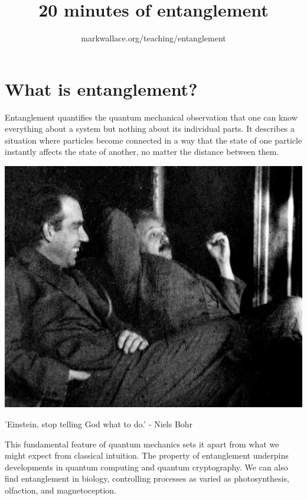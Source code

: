 \documentclass[]{tufte-handout}
\title{20 minutes of entanglement}
\author{markwallace.org/teaching/entanglement}
\date{}
\begin{document}
\maketitle


\setlength{\parindent}{0pt}



\hypertarget{what-is-entanglement}{%
\section{What is entanglement?}\label{what-is-entanglement}}

Entanglement quantifies the quantum mechanical observation that one can know everything about a system but nothing about its individual parts. It describes a situation where particles become connected in a way that the state of one particle instantly affects the state of another, no matter the distance between them.

\begin{marginfigure}

{\centering \includegraphics{img/Niels_Bohr_Albert_Einstein4} 

}

\caption['Einstein, stop telling God what to do.' - Niels Bohr]{'Einstein, stop telling God what to do.' - Niels Bohr}\label{fig:unnamed-chunk-1}
\end{marginfigure}

This fundamental feature of quantum mechanics sets it apart from what we might expect from classical intuition. The property of entanglement underpins developments in quantum computing and quantum cryptography. We can also find entanglement in biology, controlling processes as varied as photosynthesis, olfaction, and magnetoception.
\end{document}
